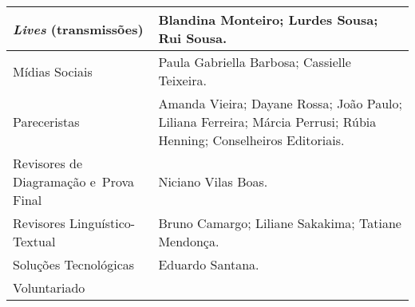 \documentclass{gescons}
\begin{document}
\begin{longtable}[]{@{}
  >{\raggedright\arraybackslash}p{}
  >{\raggedright\arraybackslash}p{}@{}}
\hline
\begin{minipage}[b]{\linewidth}\raggedright
\emph{Lives} (transmissões)
\end{minipage} & \begin{minipage}[b]{\linewidth}\raggedright
Blandina Monteiro; Lurdes Sousa; Rui Sousa.
\end{minipage} \\
\hline
\begin{minipage}[b]{\linewidth}\raggedright
Mídias Sociais
\end{minipage} & \begin{minipage}[b]{\linewidth}\raggedright
Paula Gabriella Barbosa; Cassielle Teixeira.
\end{minipage} \\
\hline
\begin{minipage}[b]{\linewidth}\raggedright
Pareceristas
\end{minipage} & \begin{minipage}[b]{\linewidth}\raggedright\addlinespace[4pt]
Amanda Vieira; Dayane Rossa; João Paulo; Liliana Ferreira; Márcia Perrusi; Rúbia Henning; Conselheiros Editoriais.
\end{minipage} \\
\hline
\begin{minipage}[b]{\linewidth}\raggedright\addlinespace[4pt]
Revisores de Diagramação e~Prova Final
\end{minipage} & \begin{minipage}[b]{\linewidth}\raggedright
Niciano Vilas Boas.
\end{minipage} \\
\hline
\begin{minipage}[b]{\linewidth}\raggedright
Revisores Linguístico-Textual
\end{minipage} & \begin{minipage}[b]{\linewidth}\raggedright
Bruno Camargo; Liliane Sakakima; Tatiane Mendonça.
\end{minipage} \\
\hline
\begin{minipage}[b]{\linewidth}\raggedright
Soluções Tecnológicas
\end{minipage} & \begin{minipage}[b]{\linewidth}\raggedright
Eduardo Santana.
\end{minipage} \\
\hline
\begin{minipage}[b]{\linewidth}\raggedright
Voluntariado
\end{minipage} & \begin{minipage}[b]{\linewidth}\raggedright

\end{minipage}
\end{longtable}
\end{document}
